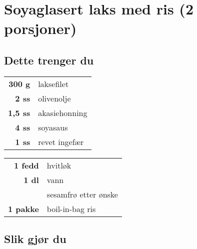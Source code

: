 \section*{Soyaglasert laks med ris (2 porsjoner)}

\subsection*{Dette trenger du}


\begin{table}[!htbp]
    \begin{tabular}[t]{rl}
        \textbf{300 g}      & laksefilet            \\
        \textbf{2 ss}       & olivenolje            \\
        \textbf{1,5 ss}     & akasiehonning         \\
        \textbf{4 ss}       & soyasaus              \\
        \textbf{1 ss}       & revet ingefær
    \end{tabular}
    \qquad
    \begin{tabular}[t]{rl}
        \textbf{1 fedd}     & hvitløk               \\
        \textbf{1 dl}       & vann                  \\
                            & sesamfrø etter ønske  \\
        \textbf{1 pakke}    & boil-in-bag ris
    \end{tabular}
\end{table}

\subsection*{Slik gjør du}

